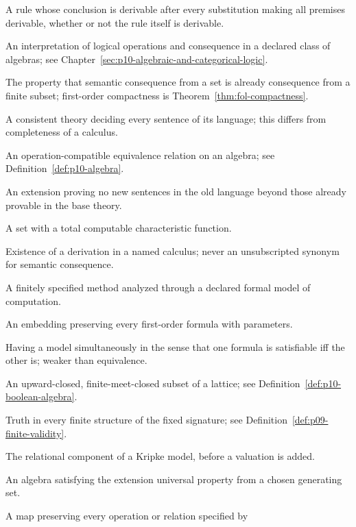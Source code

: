 \begin{description}[style=nextline,leftmargin=0pt]
\item[admissible rule] A rule whose conclusion is derivable after every
substitution making all premises derivable, whether or not the rule itself is
derivable.
\item[algebraic semantics] An interpretation of logical operations and
consequence in a declared class of algebras; see Chapter~\ref{sec:p10-algebraic-and-categorical-logic}.
\item[compactness] The property that semantic consequence from a set is already
consequence from a finite subset; first-order compactness is
Theorem~\ref{thm:fol-compactness}.
\item[complete theory] A consistent theory deciding every sentence of its
language; this differs from completeness of a calculus.
\item[congruence] An operation-compatible equivalence relation on an algebra;
see Definition~\ref{def:p10-algebra}.
\item[conservative extension] An extension proving no new sentences in the old
language beyond those already provable in the base theory.
\item[decidable set] A set with a total computable characteristic function.
\item[derivability] Existence of a derivation in a named calculus; never an
unsubscripted synonym for semantic consequence.
\item[effective procedure] A finitely specified method analyzed through a
declared formal model of computation.
\item[elementary embedding] An embedding preserving every first-order formula
with parameters.
\item[equisatisfiable] Having a model simultaneously in the sense that one
formula is satisfiable iff the other is; weaker than equivalence.
\item[filter] An upward-closed, finite-meet-closed subset of a lattice; see
Definition~\ref{def:p10-boolean-algebra}.
\item[finite validity] Truth in every finite structure of the fixed signature;
see Definition~\ref{def:p09-finite-validity}.
\item[frame] The relational component of a Kripke model, before a valuation is
added.
\item[free algebra] An algebra satisfying the extension universal property from
a chosen generating set.
\item[homomorphism] A map preserving every operation or relation specified by

\end{description}
